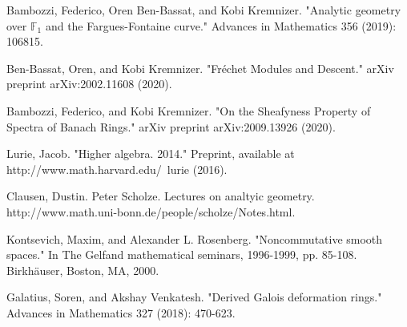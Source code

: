 \documentclass[12pt]{amsart}
\theoremstyle{definition}
\numberwithin{equation}{section}
\begin{document}
\begin{thebibliography}{10}
 Bambozzi, Federico, Oren Ben-Bassat, and Kobi Kremnizer. "Analytic geometry over $\mathbb{F}_1$ and the Fargues-Fontaine curve." Advances in Mathematics 356 (2019): 106815.


 Ben-Bassat, Oren, and Kobi Kremnizer. "Fr\'echet Modules and Descent." arXiv preprint arXiv:2002.11608 (2020).


 Bambozzi, Federico, and Kobi Kremnizer. "On the Sheafyness Property of Spectra of Banach Rings." arXiv preprint arXiv:2009.13926 (2020).







 Lurie, Jacob. "Higher algebra. 2014." Preprint, available at http://www.math.harvard.edu/~lurie (2016).


 Clausen, Dustin. Peter Scholze. Lectures on analtyic geometry. http://www.math.uni-bonn.de/people/scholze/Notes.html.



 Kontsevich, Maxim, and Alexander L. Rosenberg. "Noncommutative smooth spaces." In The Gelfand mathematical seminars, 1996-1999, pp. 85-108. Birkh\"auser, Boston, MA, 2000.



 Galatius, Soren, and Akshay Venkatesh. "Derived Galois deformation rings." Advances in Mathematics 327 (2018): 470-623.
 

\end{thebibliography}



%
\end{document}
